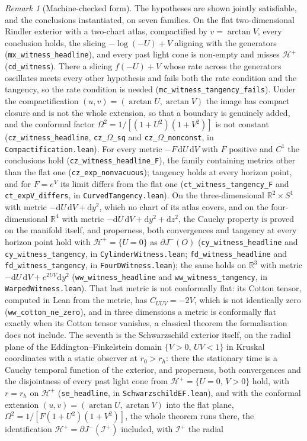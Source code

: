 \documentclass[11pt,a4paper]{article}
\theoremstyle{plain}
\theoremstyle{remark}
\newtheorem{remark}{Remark}
\begin{document}
\begin{remark}[Machine-checked form]
The hypotheses are shown jointly satisfiable, and the conclusions instantiated, on seven families. On the flat two-dimensional Rindler exterior with a two-chart atlas, compactified by $v=\arctan V$, every conclusion holds, the slicing $-\log(-U)+V$ aligning with the generators (\texttt{mx\_witness\_headline}), and every past light cone is non-empty and misses $\mathcal{H}^+$ (\texttt{cd\_witness}). There a slicing $f(-U)+V$ whose rate across the generators oscillates meets every other hypothesis and fails both the rate condition and the tangency, so the rate condition is needed (\texttt{mc\_witness\_tangency\_fails}). Under the compactification $(u,v)=(\arctan U,\arctan V)$ the image has compact closure and is not the whole extension, so that a boundary is genuinely added, and the conformal factor $\Omega^{2}=1/[(1+U^{2})(1+V^{2})]$ is not constant (\texttt{cz\_witness\_headline}, \texttt{cz\_$\Omega$\_sq} and \texttt{cz\_$\Omega$\_nonconst}, in \texttt{Compactification.lean}). For every metric $-F\,\mathrm{d}U\,\mathrm{d}V$ with $F$ positive and $C^{1}$ the conclusions hold (\texttt{cz\_witness\_headline\_F}), the family containing metrics other than the flat one (\texttt{cz\_exp\_nonvacuous}); tangency holds at every horizon point, and for $F=e^{V}$ its limit differs from the flat one (\texttt{ct\_witness\_tangency\_F} and \texttt{ct\_expV\_differs}, in \texttt{CurvedTangency.lean}). On the three-dimensional $\mathbb{R}^2\times S^1$ with metric $-\mathrm{d}U\,\mathrm{d}V+\mathrm{d}y^{2}$, which no chart of its atlas covers, and on the four-dimensional $\mathbb{R}^4$ with metric $-\mathrm{d}U\,\mathrm{d}V+\mathrm{d}y^{2}+\mathrm{d}z^{2}$, the Cauchy property is proved on the manifold itself, and properness, both convergences and tangency at every horizon point hold with $\mathcal{H}^+=\{U=0\}$ as $\partial J^-(O)$ (\texttt{cy\_witness\_headline} and \texttt{cy\_witness\_tangency}, in \texttt{CylinderWitness.lean}; \texttt{fd\_witness\_headline} and \texttt{fd\_witness\_tangency}, in \texttt{FourDWitness.lean}); the same holds on $\mathbb{R}^3$ with metric $-\mathrm{d}U\,\mathrm{d}V+e^{2UV}\mathrm{d}y^{2}$ (\texttt{ww\_witness\_headline} and \texttt{ww\_witness\_tangency}, in \texttt{WarpedWitness.lean}). That last metric is not conformally flat: its Cotton tensor, computed in Lean from the metric, has $C_{UUV}=-2V$, which is not identically zero (\texttt{ww\_cotton\_ne\_zero}), and in three dimensions a metric is conformally flat exactly when its Cotton tensor vanishes, a classical theorem the formalisation does not include. The seventh is the Schwarzschild exterior itself, on the radial plane of the Eddington--Finkelstein domain $\{V>0,\,UV<1\}$ in Kruskal coordinates with a static observer at $r_0>r_h$: there the stationary time is a Cauchy temporal function of the exterior, and properness, both convergences and the disjointness of every past light cone from $\mathcal{H}^+=\{U=0,\,V>0\}$ hold, with $r=r_h$ on $\mathcal{H}^+$ (\texttt{se\_headline}, in \texttt{SchwarzschildEF.lean}), and with the conformal extension $(u,v)=(\arctan U,\arctan V)$ into the flat plane, $\Omega^{2}=1/[F(1+U^{2})(1+V^{2})]$, the whole theorem runs there, the identification $\mathcal{H}^+=\partial J^-(\mathscr{I}^+)$ included, with $\mathscr{I}^+$ the radial 
\end{remark}
\end{document}
